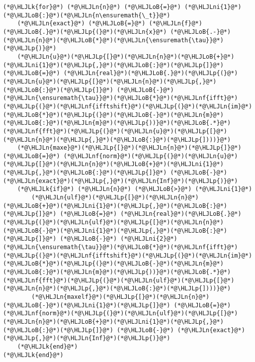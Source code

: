 \documentclass[12pt,a4paper]{article}
\newcommand{\HLJLk}[1]{\textcolor[RGB]{148,91,176}{\textbf{#1}}}
\newcommand{\HLJLn}[1]{#1}
\newcommand{\HLJLnf}[1]{\textcolor[RGB]{66,102,213}{#1}}
\newcommand{\HLJLni}[1]{\textcolor[RGB]{59,151,46}{#1}}
\newcommand{\HLJLoB}[1]{\textcolor[RGB]{102,102,102}{\textbf{#1}}}
\newcommand{\HLJLp}[1]{#1}
\begin{document}
\begin{lstlisting}
(*@\HLJLk{for}@*) (*@\HLJLn{n}@*) (*@\HLJLoB{=}@*) (*@\HLJLni{1}@*)(*@\HLJLoB{:}@*)(*@\HLJLn{n\ensuremath{\_t}}@*)
    (*@\HLJLn{exact}@*) (*@\HLJLoB{=}@*) (*@\HLJLn{f}@*)(*@\HLJLoB{.}@*)(*@\HLJLp{(}@*)(*@\HLJLn{x}@*) (*@\HLJLoB{.-}@*) (*@\HLJLn{n}@*)(*@\HLJLoB{*}@*)(*@\HLJLn{\ensuremath{\tau}}@*)(*@\HLJLp{)}@*)
    (*@\HLJLn{u}@*)(*@\HLJLp{[}@*)(*@\HLJLn{n}@*)(*@\HLJLoB{+}@*)(*@\HLJLni{1}@*)(*@\HLJLp{,}@*)(*@\HLJLoB{:}@*)(*@\HLJLp{]}@*) (*@\HLJLoB{=}@*) (*@\HLJLn{real}@*)(*@\HLJLoB{.}@*)(*@\HLJLp{(}@*)(*@\HLJLn{u}@*)(*@\HLJLp{[}@*)(*@\HLJLn{n}@*)(*@\HLJLp{,}@*)(*@\HLJLoB{:}@*)(*@\HLJLp{]}@*) (*@\HLJLoB{-}@*) (*@\HLJLn{\ensuremath{\tau}}@*)(*@\HLJLoB{*}@*)(*@\HLJLnf{ifft}@*)(*@\HLJLp{(}@*)(*@\HLJLnf{ifftshift}@*)(*@\HLJLp{(}@*)(*@\HLJLn{im}@*)(*@\HLJLoB{*}@*)(*@\HLJLp{(}@*)(*@\HLJLoB{-}@*)(*@\HLJLn{m}@*)(*@\HLJLoB{:}@*)(*@\HLJLn{m}@*)(*@\HLJLp{))}@*)(*@\HLJLoB{.*}@*)(*@\HLJLnf{fft}@*)(*@\HLJLp{(}@*)(*@\HLJLn{u}@*)(*@\HLJLp{[}@*)(*@\HLJLn{n}@*)(*@\HLJLp{,}@*)(*@\HLJLoB{:}@*)(*@\HLJLp{])))}@*) 
    (*@\HLJLn{maxe}@*)(*@\HLJLp{[}@*)(*@\HLJLn{n}@*)(*@\HLJLp{]}@*) (*@\HLJLoB{=}@*) (*@\HLJLnf{norm}@*)(*@\HLJLp{(}@*)(*@\HLJLn{u}@*)(*@\HLJLp{[}@*)(*@\HLJLn{n}@*)(*@\HLJLoB{+}@*)(*@\HLJLni{1}@*)(*@\HLJLp{,}@*)(*@\HLJLoB{:}@*)(*@\HLJLp{]}@*) (*@\HLJLoB{-}@*) (*@\HLJLn{exact}@*)(*@\HLJLp{,}@*)(*@\HLJLn{Inf}@*)(*@\HLJLp{)}@*)
    (*@\HLJLk{if}@*) (*@\HLJLn{n}@*) (*@\HLJLoB{>}@*) (*@\HLJLni{1}@*)
        (*@\HLJLn{ulf}@*)(*@\HLJLp{[}@*)(*@\HLJLn{n}@*)(*@\HLJLoB{+}@*)(*@\HLJLni{1}@*)(*@\HLJLp{,}@*)(*@\HLJLoB{:}@*)(*@\HLJLp{]}@*) (*@\HLJLoB{=}@*) (*@\HLJLn{real}@*)(*@\HLJLoB{.}@*)(*@\HLJLp{(}@*)(*@\HLJLn{ulf}@*)(*@\HLJLp{[}@*)(*@\HLJLn{n}@*)(*@\HLJLoB{-}@*)(*@\HLJLni{1}@*)(*@\HLJLp{,}@*)(*@\HLJLoB{:}@*)(*@\HLJLp{]}@*) (*@\HLJLoB{-}@*) (*@\HLJLni{2}@*)(*@\HLJLn{\ensuremath{\tau}}@*)(*@\HLJLoB{*}@*)(*@\HLJLnf{ifft}@*)(*@\HLJLp{(}@*)(*@\HLJLnf{ifftshift}@*)(*@\HLJLp{(}@*)(*@\HLJLn{im}@*)(*@\HLJLoB{*}@*)(*@\HLJLp{(}@*)(*@\HLJLoB{-}@*)(*@\HLJLn{m}@*)(*@\HLJLoB{:}@*)(*@\HLJLn{m}@*)(*@\HLJLp{))}@*)(*@\HLJLoB{.*}@*)(*@\HLJLnf{fft}@*)(*@\HLJLp{(}@*)(*@\HLJLn{ulf}@*)(*@\HLJLp{[}@*)(*@\HLJLn{n}@*)(*@\HLJLp{,}@*)(*@\HLJLoB{:}@*)(*@\HLJLp{])))}@*)
        (*@\HLJLn{maxelf}@*)(*@\HLJLp{[}@*)(*@\HLJLn{n}@*)(*@\HLJLoB{-}@*)(*@\HLJLni{1}@*)(*@\HLJLp{]}@*) (*@\HLJLoB{=}@*) (*@\HLJLnf{norm}@*)(*@\HLJLp{(}@*)(*@\HLJLn{ulf}@*)(*@\HLJLp{[}@*)(*@\HLJLn{n}@*)(*@\HLJLoB{+}@*)(*@\HLJLni{1}@*)(*@\HLJLp{,}@*)(*@\HLJLoB{:}@*)(*@\HLJLp{]}@*) (*@\HLJLoB{-}@*) (*@\HLJLn{exact}@*)(*@\HLJLp{,}@*)(*@\HLJLn{Inf}@*)(*@\HLJLp{)}@*)
    (*@\HLJLk{end}@*)
(*@\HLJLk{end}@*)
\end{lstlisting}
\end{document}
